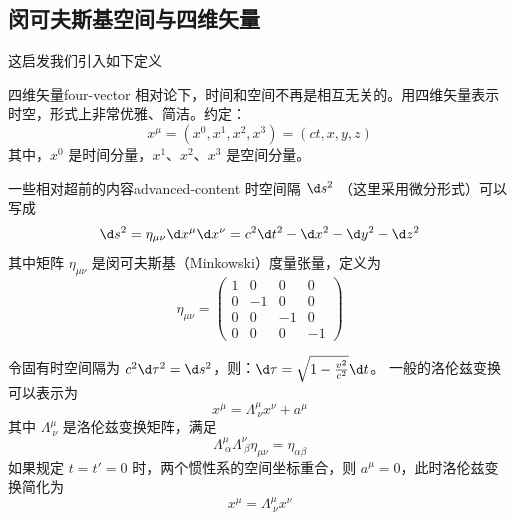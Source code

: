 \subsection{闵可夫斯基空间与四维矢量}

这启发我们引入如下定义
\begin{definition}{四维矢量}{four-vector}
    相对论下，时间和空间不再是相互无关的。用四维矢量表示时空，形式上非常优雅、简洁。约定：
    \begin{equation}
        x^\mu = (x^0, x^1, x^2, x^3) = (ct, x, y, z)
    \end{equation}
    其中，$x^0$ 是时间分量，$x^1$、$x^2$、$x^3$ 是空间分量。
\end{definition}

\begin{note}{一些相对超前的内容}{advanced-content}
    时空间隔 $\d s^2$ （这里采用微分形式）可以写成
    \begin{equation}
        \d s^2 = \eta_{\mu \nu} \d x^\mu \d x^\nu = c^2 \d t^2 - \d x^2 - \d y^2 - \d z^2
    \end{equation}
    其中矩阵 $\eta_{\mu \nu}$ 是闵可夫斯基（Minkowski）度量张量，定义为
    \begin{equation}
        \eta_{\mu \nu} = \begin{pmatrix}
            1 & 0  & 0  & 0  \\
            0 & -1 & 0  & 0  \\
            0 & 0  & -1 & 0  \\
            0 & 0  & 0  & -1
        \end{pmatrix}
    \end{equation}

    令固有时空间隔为 $c^2 \d \tau^2 = \d s^2$，则：$\d \tau = \sqrt{1 - \frac{v^2}{c^2}} \d t$。
    一般的洛伦兹变换可以表示为
    \begin{equation}
        x^{\mu} = {\Lambda}^{\mu}_{\ \nu} x^{\nu} + a^{\mu}
    \end{equation}
    其中 $\Lambda^\mu_{\ \nu}$ 是洛伦兹变换矩阵，满足
    \begin{equation}
        {\Lambda}^{\mu}_{\ \alpha} {\Lambda}^{\nu}_{\ \beta} {\eta}_{\mu \nu} = {\eta}_{\alpha \beta}
    \end{equation}
    如果规定 $t = t' = 0$ 时，两个惯性系的空间坐标重合，则 $a^\mu = 0$，此时洛伦兹变换简化为
    \begin{equation}
        x^{\mu} = {\Lambda}^{\mu}_{\ \nu} x^{\nu}
    \end{equation}
\end{note}

